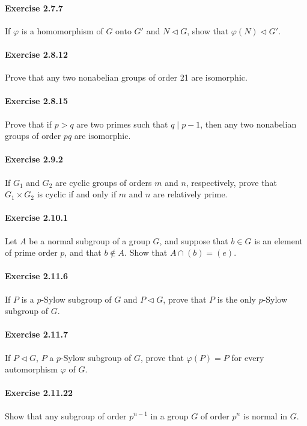 \documentclass{article}
\begin{document}
\paragraph{Exercise 2.7.7} If $\varphi$ is a homomorphism of $G$ onto $G'$ and $N \triangleleft G$, show that $\varphi(N) \triangleleft G'$.


\paragraph{Exercise 2.8.12} Prove that any two nonabelian groups of order 21 are isomorphic.


\paragraph{Exercise 2.8.15} Prove that if $p > q$ are two primes such that $q \mid p - 1$, then any two nonabelian groups of order $pq$ are isomorphic.


\paragraph{Exercise 2.9.2} If $G_1$ and $G_2$ are cyclic groups of orders $m$ and $n$, respectively, prove that $G_1 \times G_2$ is cyclic if and only if $m$ and $n$ are relatively prime.


\paragraph{Exercise 2.10.1} Let $A$ be a normal subgroup of a group $G$, and suppose that $b \in G$ is an element of prime order $p$, and that $b \not\in A$. Show that $A \cap (b) = (e)$.


\paragraph{Exercise 2.11.6} If $P$ is a $p$-Sylow subgroup of $G$ and $P \triangleleft G$, prove that $P$ is the only $p$-Sylow subgroup of $G$.


\paragraph{Exercise 2.11.7} If $P \triangleleft G$, $P$ a $p$-Sylow subgroup of $G$, prove that $\varphi(P) = P$ for every automorphism $\varphi$ of $G$.


\paragraph{Exercise 2.11.22} Show that any subgroup of order $p^{n-1}$ in a group $G$ of order $p^n$ is normal in $G$.
\end{document}
